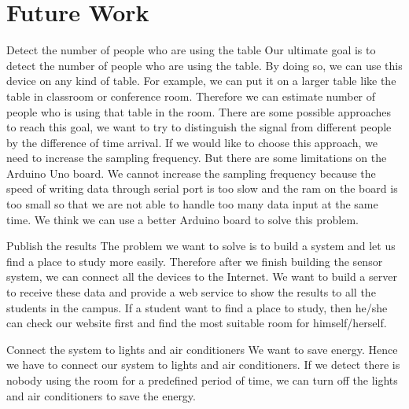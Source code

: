 \documentclass{sig-alternate-ipsn13}
\begin{document}
\section{Future Work}

Detect the number of people who are using the table
Our ultimate goal is to detect the number of people who are using the table. By doing so, we can use this device on any kind of table. For example, we can put it on a larger table like the table in classroom or conference room. Therefore we can estimate number of people who is using that table in the room. There are some possible approaches to reach this goal, we want to try to distinguish the signal from different people by the difference of time arrival. If we would like to choose this approach, we need to increase the sampling frequency. But there are some limitations on the Arduino Uno board. We cannot increase the sampling frequency because the speed of writing data through serial port is too slow and the ram on the board is too small so that we are not able to handle too many data input at the same time. We think we can use a better Arduino board to solve this problem. 

Publish the results
The problem we want to solve is to build a system and let us find a place to study more easily. Therefore after we finish building the sensor system, we can connect all the devices to the Internet. We want to build a server to receive these data and provide a web service to show the results to all the students in the campus. If a student want to find a place to study, then he/she can check our website first and find the most suitable room for himself/herself.

Connect the system to lights and air conditioners
We want to save energy. Hence we have to connect our system to lights and air conditioners. If we detect there is nobody using the room for a predefined period of time, we can turn off the lights and air conditioners to save the energy.




%

%
%


\end{document}
